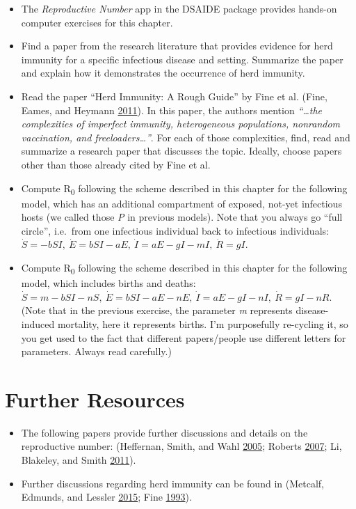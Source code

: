 \documentclass[]{book}
\providecommand{\tightlist}{%
  \setlength{\itemsep}{0pt}\setlength{\parskip}{0pt}}
\theoremstyle{definition}
\theoremstyle{definition}
\theoremstyle{definition}
\theoremstyle{remark}
\begin{document}
\begin{itemize}
\tightlist
\item
  The \emph{Reproductive Number} app in the DSAIDE package provides
  hands-on computer exercises for this chapter.
\item
  Find a paper from the research literature that provides evidence for
  herd immunity for a specific infectious disease and setting. Summarize
  the paper and explain how it demonstrates the occurrence of herd
  immunity.
\item
  Read the paper ``Herd Immunity: A Rough Guide'' by Fine et al. (Fine,
  Eames, and Heymann \protect\hyperlink{ref-fine11}{2011}). In this
  paper, the authors mention \emph{``\ldots{}the complexities of
  imperfect immunity, heterogeneous populations, nonrandom vaccination,
  and freeloaders\ldots{}''}. For each of those complexities, find, read
  and summarize a research paper that discusses the topic. Ideally,
  choose papers other than those already cited by Fine et al.
\item
  Compute R\textsubscript{0} following the scheme described in this
  chapter for the following model, which has an additional compartment
  of exposed, not-yet infectious hosts (we called those \emph{P} in
  previous models). Note that you always go ``full circle'', i.e.~from
  one infectious individual back to infectious individuals:
  \(\dot S = -b SI, \ \dot E = b S I - a E, \ \dot I = a E - g I - m I, \ \dot R = g I\).
\item
  Compute R\textsubscript{0} following the scheme described in this
  chapter for the following model, which includes births and deaths:
  \(\dot S =m - b SI - n S, \ \dot E = b S I - a E - n E, \ \dot I = a E - g I - n I, \ \dot R = g I - n R\).
  (Note that in the previous exercise, the parameter \emph{m} represents
  disease-induced mortality, here it represents births. I'm purposefully
  re-cycling it, so you get used to the fact that different
  papers/people use different letters for parameters. Always read
  carefully.)
\end{itemize}

\section{Further Resources}\label{further-resources-3}

\begin{itemize}
\tightlist
\item
  The following papers provide further discussions and details on the
  reproductive number: (Heffernan, Smith, and Wahl
  \protect\hyperlink{ref-heffernan05}{2005}; Roberts
  \protect\hyperlink{ref-roberts07}{2007}; Li, Blakeley, and Smith
  \protect\hyperlink{ref-li11}{2011}).
\item
  Further discussions regarding herd immunity can be found in (Metcalf,
  Edmunds, and Lessler \protect\hyperlink{ref-metcalf15}{2015}; Fine
  \protect\hyperlink{ref-fine93}{1993}).
\end{itemize}
\end{document}
